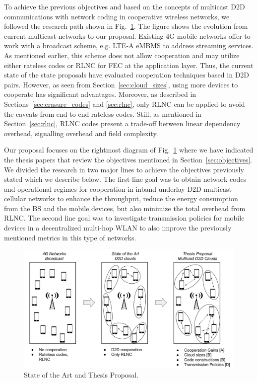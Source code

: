 To achieve the previous objectives and based on the concepts of multicast \ac{D2D} communications with network coding in cooperative wireless networks, we followed the research path shown in Fig.~\ref{fig:proposal}. The figure shows the evolution from current multicast networks to our proposal. Existing 4G mobile networks offer to work with a broadcast scheme, e.g. \ac{LTE-A} \ac{eMBMS} to address streaming services. As mentioned earlier, this scheme does not allow cooperation and may utilize either rateless codes or \ac{RLNC} for \ac{FEC} at the application layer. Thus, the current state of the state proposals have evaluated cooperation techniques based in \ac{D2D} pairs. However, as seen from Section~\ref{sec:cloud_sizes}, using more devices to cooperate has significant advantages. Moreover, as described in Sections~\ref{sec:erasure_codes} and \ref{sec:rlnc}, only \ac{RLNC} can be applied to avoid the caveats from end-to-end rateless codes. Still, as mentioned in Section~\ref{sec:rlnc}, \ac{RLNC} codes present a trade-off between linear dependency overhead, signalling overhead and field complexity.

Our proposal focuses on the rightmost diagram of Fig.~\ref{fig:proposal} where we have indicated the thesis papers that review the objectives mentioned in Section~\ref{sec:objectives}. We divided the research in two major lines to achieve the objectives previously stated which we describe below. The first line goal was to obtain network codes and operational regimes for cooperation in inband underlay \ac{D2D} multicast cellular networks to enhance the throughput, reduce the energy consumption from the \ac{BS} and the mobile devices, but also minimize the total overhead from \ac{RLNC}. The second line goal was to investigate transmission policies for mobile devices in a decentralized multi-hop \ac{WLAN} to also improve the previously mentioned metrics in this type of networks.

\begin{figure}[h]
  \centering
  \includegraphics[width=\textwidth]{introduction/figures/thesis-diagrams.pdf}
  \caption{State of the Art and Thesis Proposal.}
\label{fig:proposal}
\end{figure}

